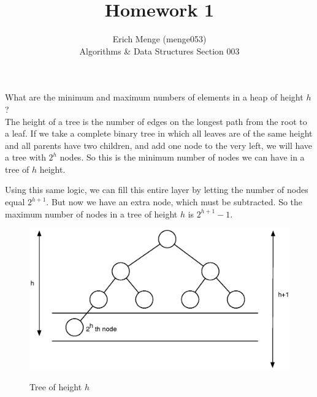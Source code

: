 \documentclass[12pt]{article}
\newenvironment{problem}[2][Problem]{\begin{trivlist}
\item[\hskip \labelsep {\bfseries #1}\hskip \labelsep {\bfseries #2.}]}{\end{trivlist}}
\begin{document}

\title{Homework 1}%
\author{Erich Menge (menge053) \\ %
Algorithms \& Data Structures Section 003} %

\maketitle

\begin{problem}{6.1-1} What are the minimum and maximum numbers of elements in a heap of height $h$? \\

    The height of a tree is the number of edges on the longest path from the root to a leaf. If we take a complete binary tree
    in which all leaves are of the same height and all parents have two children, and add one node to the very left, we will have
    a tree with $\boxed{2^{h}}$ nodes. So this is the minimum number of nodes we can have in a tree of $h$ height.

    Using this same logic, we can fill this entire layer by letting the number of nodes equal $2^{h+1}$. But now we
    have an extra node, which must be subtracted. So the maximum number of nodes in a tree of height $h$ is $\boxed{2^{h+1} - 1}$.
    \begin{figure}[h!]
        \centering
        \caption{Tree of height $h$}
        \includegraphics[scale=.75]{bin_tree1.eps}
        \label{fig:bintree1}
    \end{figure}
\end{problem}
\end{document}
